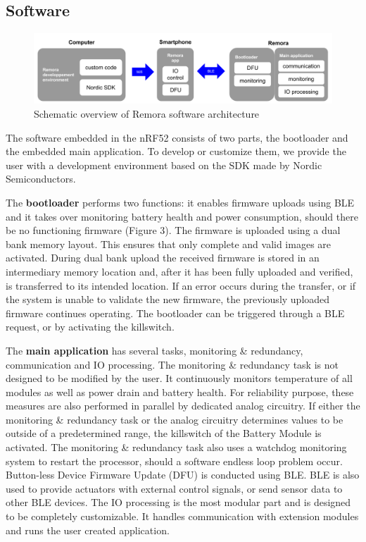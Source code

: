 \documentclass[runningheads,a4paper]{llncs}
\begin{document}
\subsection{Software}
\begin{figure}
 \includegraphics[scale=0.275]{software}
 

\caption{Schematic overview of Remora software architecture}
\end{figure}
The software embedded in the nRF52 consists of two parts, the bootloader and the embedded main application. To develop or customize them, we provide the user with a development environment based on the SDK made by Nordic Semiconductors.

The \textbf{bootloader} performs two functions: it enables firmware uploads using BLE and it takes over monitoring battery health and power consumption, should there be no functioning firmware (Figure 3). The firmware is uploaded using a dual bank memory layout. This ensures that only complete and valid images are activated. During dual bank upload the received firmware is stored in an intermediary memory location and, after it has been fully uploaded and verified, is transferred to its intended location. If an error occurs during the transfer, or if the system is unable to validate the new firmware, the previously uploaded firmware continues operating. The bootloader can be triggered through a BLE request, or by activating the killswitch. 

The \textbf{main application} has several tasks, monitoring \& redundancy, communication and IO processing. The monitoring \& redundancy task is not designed to be modified by the user. It continuously monitors temperature of all modules as well as power drain and battery health. For reliability purpose, these measures are also performed in parallel by dedicated analog circuitry. If either the monitoring \& redundancy task or the analog circuitry determines values to be outside of a predetermined range, the killswitch of the Battery Module is activated. The monitoring \& redundancy task also uses a watchdog monitoring system to restart the processor, should a software endless loop problem occur. Button-less Device Firmware Update (DFU) is conducted using BLE. BLE is also used to provide actuators with external control signals, or send sensor data to other BLE devices. The IO processing is the most modular part and is designed to be completely customizable. It handles communication with extension modules and runs the user created application. 
\end{document}
